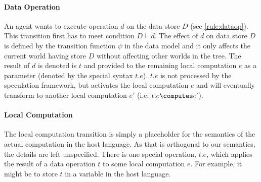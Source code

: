\paragraph*{Data Operation}
An agent wants to execute operation $d$ on the data store $D$
(see \ref{rule:dataop}).
This transition first has to meet condition $D\vdash d$. 
The effect of $d$ on data store $D$ is defined by
the transition function $\psi$ in the data model and it only
affects the current world having store $D$
without affecting other worlds in the tree.
The result of $d$ is denoted is $t$ and provided to the remaining local 
computation $e$ as a parameter (denoted by the special syntax $t.e$). 
$t.e$ is not processed by the speculation framework, but 
activates the local computation $e$ and will eventually transform to another 
local computation $e'$ (i.e. $t.e\computes e'$). 

\paragraph*{Local Computation}
The local computation transition is simply a placeholder for
the semantics of the actual computation in the host language.
As that is orthogonal to our semantics, the details are left
unspecified. There is one special operation, $t.e$, which applies
the result of a data operation $t$ to some local computation $e$.
For example, it might be to store $t$ in a variable in the host language.

